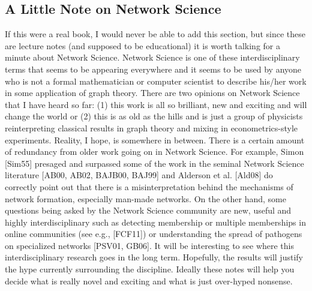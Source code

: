 %
\subsection{A Little Note on Network Science}
If this were a real book, I would never be able to add this section, but since these are lecture notes (and supposed to be educational) it is worth talking for a minute about Network Science.
Network Science is one of these interdisciplinary terms that seems to be appearing everywhere and it seems to be used by anyone who is not a formal mathematician or computer scientist to describe his/her work in some application of graph theory.
%
There are two opinions on Network Science that I have heard so far:
(1) this work is all so brilliant, new and exciting and will change the world or
(2) this is as old as the hills and is just a group of physicists reinterpreting classical results in graph theory and mixing in econometrics-style experiments.
%
Reality, I hope, is somewhere in between.
There is a certain amount of redundancy from older work going on in Network Science.
For example, Simon [Sim55] presaged and surpassed some of the work in the seminal Network Science literature [AB00, AB02, BAJB00, BAJ99] and Alderson et al. [Ald08] do correctly point out that there is a misinterpretation behind the mechanisms of network formation, especially man-made networks.
On the other hand, some questions being asked by the Network Science community are new, useful and highly interdisciplinary such as detecting membership or multiple memberships in online communities (see e.g., [FCF11]) or understanding the spread of pathogens on specialized networks [PSV01, GB06].
It will be interesting to see where this interdisciplinary research goes in the long term.
Hopefully, the results will justify the hype currently surrounding the discipline.
Ideally these notes will help you decide what is really novel and exciting and what is just over-hyped nonsense.

%
